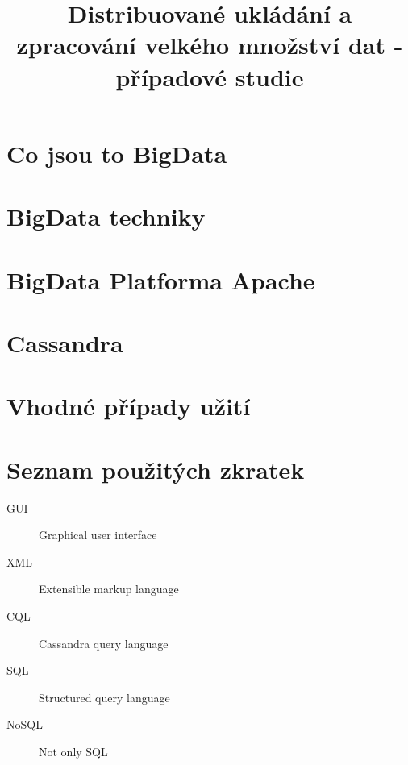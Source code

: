 \documentclass[thesis=M,czech]{FITthesis}[2012/06/26]
\title{Distribuované ukládání a zpracování velkého množství dat - případové studie}
\begin{document}
	

\begin{introduction}




\end{introduction}


\chapter{Co jsou to BigData}




\chapter{BigData techniky}



\chapter{BigData Platforma Apache}



\chapter{Cassandra}	




\chapter{Vhodné případy užití}



\begin{conclusion}

\end{conclusion}

\nocite{*}



\appendix

\chapter{Seznam použitých zkratek}
\begin{description}
	\item[GUI] Graphical user interface
	\item[XML] Extensible markup language
	\item[CQL] Cassandra query language
	\item[SQL] Structured query language
	\item[NoSQL] Not only SQL
\end{description}
\end{document}
